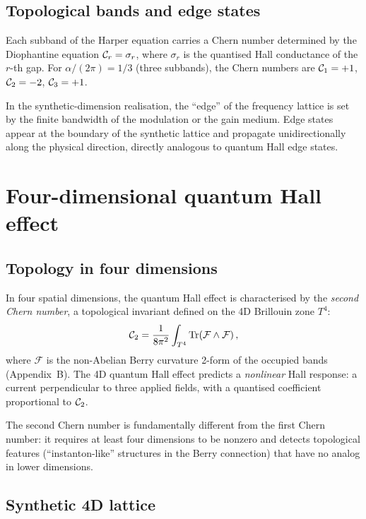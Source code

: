 \subsection{Topological bands and edge states}
\label{sec:ch16-harper-topology}

Each subband of the Harper equation carries a Chern number determined by
the Diophantine equation $\mathcal{C}_r = \sigma_r$, where $\sigma_r$ is
the quantised Hall conductance of the $r$-th gap.  For
$\alpha/(2\pi)=1/3$ (three subbands), the Chern numbers are
$\mathcal{C}_1=+1$, $\mathcal{C}_2=-2$, $\mathcal{C}_3=+1$.

In the synthetic-dimension realisation, the ``edge'' of the frequency
lattice is set by the finite bandwidth of the modulation or the gain
medium.  Edge states appear at the boundary of the synthetic lattice
and propagate unidirectionally along the physical direction, directly
analogous to quantum Hall edge states.

\section{Four-dimensional quantum Hall effect}
\label{sec:ch16-4d}

\subsection{Topology in four dimensions}
\label{sec:ch16-4d-topology}

In four spatial dimensions, the quantum Hall effect is characterised by
the \emph{second Chern number}, a topological invariant defined on the
4D Brillouin zone $T^4$:
\begin{equation}\label{eq:ch16-second-chern}
  \mathcal{C}_2 = \frac{1}{8\pi^2}\int_{T^4}
  \operatorname{Tr}(\mathcal{F}\wedge\mathcal{F})\,,
\end{equation}
where $\mathcal{F}$ is the non-Abelian Berry curvature 2-form of the
occupied bands (Appendix~B).  The 4D quantum Hall effect predicts a
\emph{nonlinear} Hall response: a current perpendicular to three
applied fields, with a quantised coefficient proportional to $\mathcal{C}_2$.

The second Chern number is fundamentally different from the first Chern
number: it requires at least four dimensions to be nonzero and detects
topological features (``instanton-like'' structures in the Berry
connection) that have no analog in lower dimensions.

\subsection{Synthetic 4D lattice}
\label{sec:ch16-4d-lattice}

